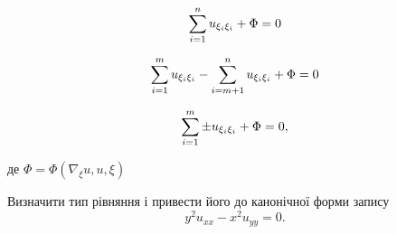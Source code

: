\begin{th_equation}
	\begin{equation}
		\displaystyle\sum\limits_{i=1}^n u_{\xi_i\xi_i} + \Phi = 0
	\end{equation}
\end{th_equation}

\begin{th_equation}
	\begin{equation}
		\displaystyle\sum\limits_{i=1}^m u_{\xi_i\xi_i} - \displaystyle\sum\limits_{i=m+1}^n u_{\xi_i\xi_i} + \Phi = 0
	\end{equation}
\end{th_equation}

\begin{th_equation}
	\begin{equation}
		\displaystyle\sum\limits_{i=1}^m \pm u_{\xi_i\xi_i} + \Phi = 0,
	\end{equation}
\end{th_equation}

де $\Phi=\Phi(\nabla_\xi u, u,\xi) $

\begin{example}
	Визначити тип рівняння і привести його до канонічної форми запису
	\begin{equation*}
		y^2 u_{xx} - x^2 u_{yy} = 0.
	\end{equation*}
\end{example}

